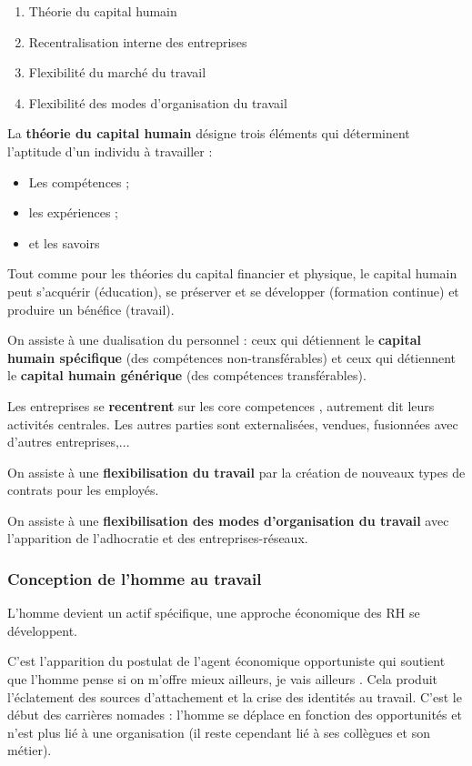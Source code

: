 \documentclass[12pt]{article}
\begin{document}
		\begin{enumerate}
		 \item Théorie du capital humain
		 \item Recentralisation interne des entreprises
		 \item Flexibilité du marché du travail
		 \item Flexibilité des modes d'organisation du travail
		\end{enumerate}
		
		La \textbf{théorie du capital humain} désigne trois éléments qui déterminent l'aptitude d'un individu à travailler :
		
		\begin{itemize}
		 \item Les compétences ;
		 \item les expériences ;
		 \item et les savoirs
		\end{itemize}
		
		Tout comme pour les théories du capital financier et physique, le capital humain peut s'acquérir (éducation), se préserver et se développer (formation continue) et produire un bénéfice (travail).
		
		On assiste à une dualisation du personnel : ceux qui détiennent le \textbf{capital humain spécifique} (des compétences non-transférables) et ceux qui détiennent le \textbf{capital humain générique} (des compétences transférables).
		
		Les entreprises se \textbf{recentrent} sur les \og{} core competences \fg{}, autrement dit leurs activités centrales. Les autres parties sont externalisées, vendues, fusionnées avec d'autres entreprises,...
		
		On assiste à une \textbf{flexibilisation du travail} par la création de nouveaux types de contrats pour les employés.
		
		On assiste à une \textbf{flexibilisation des modes d'organisation du travail} avec l'apparition de l'adhocratie et des entreprises-réseaux.
		
		\subsubsection{Conception de l’homme au travail}
		
		L'homme devient un actif spécifique, une approche économique des RH se développent.
		
		C'est l'apparition du postulat de \og{} l'agent économique opportuniste \fg{} qui soutient que l'homme pense \og{} si on m'offre mieux ailleurs, je vais ailleurs \fg{}. Cela produit l'éclatement des sources d'attachement et la crise des identités au travail. C'est le début des carrières nomades : l'homme se déplace en fonction des opportunités et n'est plus lié à une organisation (il reste cependant lié à ses collègues et son métier).
		
\end{document}
